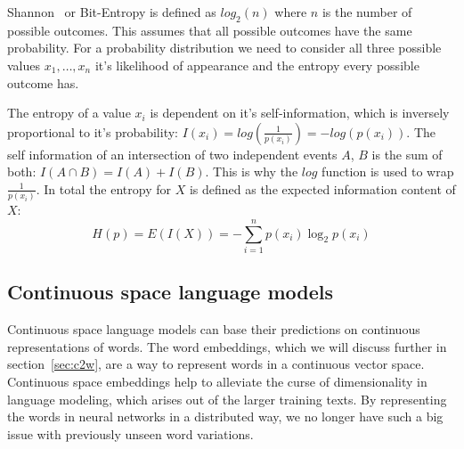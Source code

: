 Shannon~\cite{Shannon:1948} or Bit-Entropy is defined as $log_2(n)$ where $n$ is the number of possible outcomes. 
This assumes that all possible outcomes have the same probability. For a probability distribution 
we need to consider all three possible values ${x_1,\dots,x_n}$ it's likelihood of appearance and the entropy every possible outcome has.

The entropy of a value $x_i$ is dependent on it's self-information, which is inversely proportional to it's probability:
$I(x_i) = log(\frac{1}{p(x_i)}) = -log(p(x_i))$.
The self information of an intersection of two independent events $A$, $B$ is the sum of both: $I(A \cap B) = I(A) + I(B)$.
This is why the $log$ function is used to wrap $\frac{1}{p(x_i)}$.
In total the entropy for $X$ is defined as the expected information content of $X$: 
\[
    H(p) = E(I(X)) = -\sum_{i=1}^{n} p(x_i)\log_2 p(x_i)
\]




\subsection{Continuous space language models}
\label{subsec:cslm}

Continuous space language models can base their predictions on continuous representations of words. The word embeddings, which we will
discuss further in section~\ref{sec:c2w}, are a way to represent words in a continuous vector space. 
Continuous space embeddings help to alleviate the curse of dimensionality in language modeling, which arises out of the larger 
training texts. By representing the words in neural networks in a distributed way, 
we no longer have such a big issue with previously unseen word variations.

